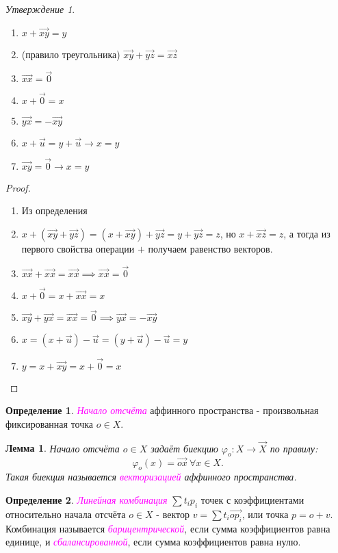 \documentclass[a4paper,100pt]{article}
\theoremstyle{indented}
\newtheorem{lemma}{Лемма}
\theoremstyle{definition}
\newtheorem{defn}{Определение}
\theoremstyle{remark}
\newtheorem{stat}{Утверждение}
\DeclareMathOperator{\ra}{\rightarrow}
\begin{document}
\begin{stat}
    \begin{enumerate}
        \item $x+\vec{xy}=y$
        \item (правило треугольника) $\vec{xy}+\vec{yz}=\vec{xz}$
        \item $\vec{xx}=\vec{0}$
        \item $x+\vec{0}=x$
        \item $\vec{yx}=-\vec{xy}$
        \item $x+\vec{u}=y+\vec{u} \longrightarrow x=y$
        \item $\vec{xy}=\vec{0} \longrightarrow x=y$
    \end{enumerate}
    \begin{proof}
    \begin{enumerate}
        \item Из определения
        \item $x+(\vec{xy}+\vec{yz})=(x+\vec{xy})+\vec{yz}=y+\vec{yz}=z$, но $x+\vec{xz}=z$, а тогда из первого свойства операции $+$ получаем равенство векторов.
        \item $\vec{xx}+\vec{xx}=\vec{xx} \implies \vec{xx}=\vec{0}$
        \item $x+\vec{0}=x+\vec{xx}=x$
        \item $\vec{xy}+\vec{yx}=\vec{xx}=\vec{0} \implies \vec{yx}=-\vec{xy}$
        \item $x=(x+\vec{u})-\vec{u}=(y+\vec{u})-\vec{u}=y$
        \item $y=x+\vec{xy}=x+\vec{0}=x$
    \end{enumerate}
    \end{proof}
\end{stat}

\begin{defn}
    \textit{\textcolor{magenta}{\hypertarget{s5}{Начало отсчёта}}} аффинного пространства - произвольная фиксированная точка $o\in X$. 
\end{defn}

\begin{lemma}
    Начало отсчёта $o\in X$ задаёт биекцию $\varphi_o: X\ra \vec{X}$ по правилу:
    \[
        \varphi_o(x)=\vec{ox} \: \forall x \in X. 
    \]
    Такая биекция называется \textit{\textcolor{magenta}{\hypertarget{s6}{векторизацией}}} аффинного пространства.
\end{lemma}

\begin{defn}
    \textit{\textcolor{magenta}{\hypertarget{s7}{Линейная комбинация}}} $\sum t_i p_i$ точек с коэффициентами относительно начала отсчёта $o\in X$ - вектор $v = \sum t_i \vec{op_i}$, или точка $p=o+v$. Комбинация называется \textit{\textcolor{magenta}{\hypertarget{s8}{барицентрической}}}, если сумма коэффициентов равна единице, и \textit{\textcolor{magenta}{\hypertarget{s9}{сбалансированной}}}, если сумма коэффициентов равна нулю.
\end{defn}
\end{document}
